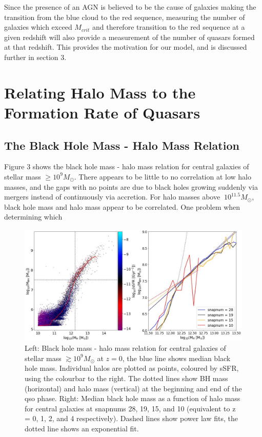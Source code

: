 \documentclass[12pt]{article}%
\begin{document}
\vspace*{1cm}

Since the presence of an AGN is believed to be the cause of galaxies making the transition from the blue cloud to the red sequence, measuring the number of galaxies which exceed $M_{crit}$ and therefore transition to the red sequence at a given redshift will also provide a measurement of the number of quasars formed at that redshift. This provides the motivation for our model, and is discussed further in section 3.

\section{Relating Halo Mass to the Formation Rate of Quasars}
\subsection{The Black Hole Mass - Halo Mass Relation}

Figure 3 shows the black hole mass - halo mass relation for central galaxies of stellar mass $\geq10^9M_\odot$. There appears to be little to no correlation at low halo masses, and the gaps with no points are due to black holes growing suddenly via mergers instead of continuously via accretion. For halo masses above $~10^{11.5}M_\odot$, black hole mass and halo mass appear to be correlated. One problem when determining which

\onecolumngrid


\begin{figure}[H]
\centering
\includegraphics[width=17cm]{Plot_3.jpeg}
\caption{Left: Black hole mass - halo mass relation for central galaxies of stellar mass $\gtrsim10^9M_\odot$ at $z=0$, the blue line shows median black hole mass. Individual halos are plotted as points, coloured by sSFR, using the colourbar to the right. The dotted lines show BH mass (horizontal) and halo mass (vertical) at the beginning and end of the qso phase. Right: Median black hole mass as a function of halo mass for central galaxies at snapnums 28, 19, 15, and 10 (equivalent to z = 0, 1, 2, and 4 respectively). Dashed lines show power law fits, the dotted line shows an exponential fit.}
\label{fig:3}
\end{figure}
\twocolumngrid
\end{document}
